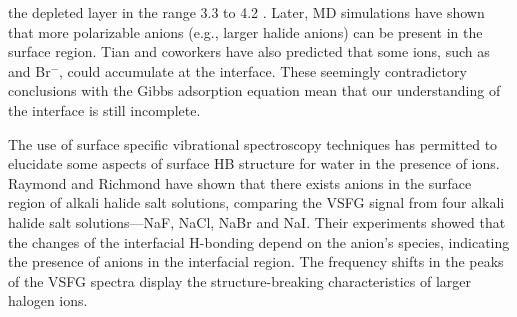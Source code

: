 the depleted layer in the range 3.3 to 4.2 \A.
Later, MD simulations have shown that more polarizable anions (e.g., larger halide anions) 
can be present in the surface region\cite{Jungwirth2001,Jungwirth2002}. 
Tian and coworkers\cite{TianCS2011} have also predicted that some ions, such as \I and Br$^{-}$, could accumulate at the interface.
These seemingly contradictory conclusions with the Gibbs adsorption equation mean that our understanding of the interface is still incomplete. 

%

The use of surface specific vibrational spectroscopy techniques has 
permitted to elucidate some aspects of surface HB structure for water in 
the presence of ions\cite{Jubb2012,AGL05}. 
Raymond and Richmond\cite{Raymond2004} have shown that there exists anions in the surface region of alkali halide salt solutions, 
comparing the VSFG signal from four alkali halide salt solutions---NaF, NaCl, NaBr 
and NaI. Their experiments showed that the changes of the interfacial H-bonding depend on the anion's species, 
indicating the presence of anions in the interfacial region. The frequency shifts in the peaks of the VSFG spectra display 
the structure-breaking characteristics of larger halogen ions.

